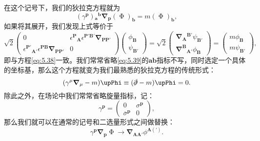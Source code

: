 在这个记号下，我们的狄拉克方程就为
\begin{equation}
	(\gamma ^{\boldsymbol{p}} ){_{\boldsymbol{a}}}^{\boldsymbol{b}}\boldsymbol{\nabla }_{\boldsymbol{p}}( \upPhi )_{\boldsymbol{b}} =m( \upPhi )_{\boldsymbol{b}} ,
	\label{eq:5.39}
\end{equation}
如果将其展开，我们发现上式等价于
\begin{equation*}
	\sqrt{2}\begin{pmatrix}
		0 & \epsilon ^{\boldsymbol{P}}{}_{\boldsymbol{A}} \epsilon ^{\boldsymbol{P}'\boldsymbol{B}'}\boldsymbol{\nabla }_{\boldsymbol{PP} '}\\
		\epsilon ^{\boldsymbol{P} '}{}_{\boldsymbol{A} '} \epsilon ^{\boldsymbol{PB}}\boldsymbol{\nabla }_{\boldsymbol{PP} '} & 0
	\end{pmatrix}\begin{pmatrix}
		\phi _{\boldsymbol{B}}\\
		\psi _{\boldsymbol{B} '}
	\end{pmatrix} =\sqrt{2}\begin{pmatrix}
		\boldsymbol{\nabla }{_{\boldsymbol{A}}}^{\boldsymbol{B} '} \psi _{\boldsymbol{B} '}\\
		\boldsymbol{\nabla }^{\boldsymbol{B}}{}_{\boldsymbol{A} '} \phi _{\boldsymbol{B}}
	\end{pmatrix} =\begin{pmatrix}
		m\phi _{\boldsymbol{B}}\\
		m\psi _{\boldsymbol{B} '}
	\end{pmatrix} ,
\end{equation*}
即与方程\ref{eq:5.38}一致。我们常常省略\ref{eq:5.39}的$\boldsymbol{ab}$指标不写，同时选定一个具体的坐标基，那么这个方程就变为我们最熟悉的狄拉克方程的传统形式\parencite{weinberg1995quantum,schwartz2014quantum}：
\begin{equation*}
	(\gamma ^{\mu }\boldsymbol{\nabla }_{\mu } -m)\upPhi \equiv (\slashed{\partial } -m)\upPhi =0.
\end{equation*}
除此之外，在场论中我们常常省略旋量指标，记：
\begin{equation*}
	\gamma ^{\boldsymbol{p}} =\begin{pmatrix}
		0 & \sigma ^{\boldsymbol{p}}\\
		\overline{\sigma }^{\boldsymbol{p}} & 0
	\end{pmatrix} ,
\end{equation*}
那么我们就可以在通常的记号和二选量形式之间做替换：
\begin{equation*}
	\gamma ^{\boldsymbol{p}}\boldsymbol{\nabla }_{\boldsymbol{p}} \upPhi \rightarrow \boldsymbol{\nabla }_{\boldsymbol{AA} '} \phi ^{\boldsymbol{A}( ')} .
\end{equation*}


